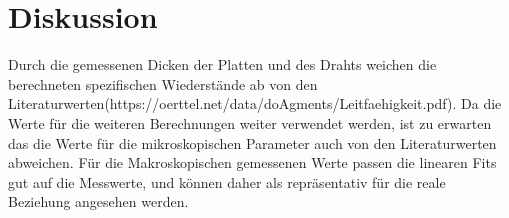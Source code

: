 \newpage
\section{Diskussion}
Durch die gemessenen Dicken der Platten und des Drahts weichen die berechneten spezifischen Wiederstände ab von den Literaturwerten(https://oerttel.net/data/doAgments/Leitfaehigkeit.pdf).
Da die Werte für die weiteren Berechnungen weiter verwendet werden, ist zu erwarten das die Werte für die mikroskopischen Parameter auch von den Literaturwerten abweichen.
Für die Makroskopischen gemessenen Werte passen die linearen Fits gut auf die Messwerte, und können daher als repräsentativ für die reale Beziehung angesehen werden. 
\label{sec:Diskussion}
